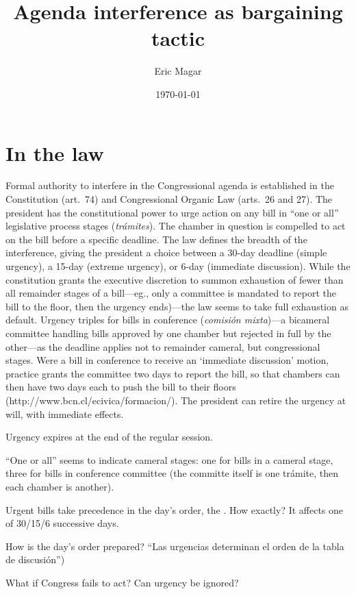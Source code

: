 \documentclass{article}
\title{Agenda interference as bargaining tactic}
\author{Eric Magar}
\date{\today}
\begin{document}
\section{In the law}

Formal authority to interfere in the Congressional agenda is established in the Constitution (art.\ 74) and Congressional Organic Law (arts.\ 26 and 27). The president has the constitutional power to urge action on any bill in ``one or all'' legislative process stages (\emph{trámites}). The chamber in question is compelled to act on the bill before a specific deadline. The law defines the breadth of the interference, giving the president a choice between a 30-day deadline (simple urgency), a 15-day (extreme urgency), or 6-day (immediate discussion). While the constitution grants the executive discretion to summon exhaustion of fewer than all remainder stages of a bill---eg., only a committee is mandated to report the bill to the floor, then the urgency ends)---the law seems to take full exhaustion as default. Urgency triples for bills in conference (\emph{comisión mixta})---a bicameral committee handling bills approved by one chamber but rejected in full by the other---as the deadline applies not to remainder cameral, but congressional stages. Were a bill in conference to receive an `immediate discussion' motion, practice grants the committee two days to report the bill, so that chambers can then have two days each to push the bill to their floors (http://www.bcn.cl/ecivica/formacion/). The president can retire the urgency at will, with immediate effects. 

Urgency expires at the end of the regular session. 

``One or all'' seems to indicate cameral stages: one for bills in a cameral stage, three for bills in conference committee (the committe itself is one trámite, then each chamber is another). 

Urgent bills take precedence in the day's order, the . How exactly? It affects one of 30/15/6 successive days. 

How is the day's order prepared? ``Las urgencias determinan el orden de la tabla de discusión'')

What if Congress fails to act? Can urgency be ignored?
\end{document}
